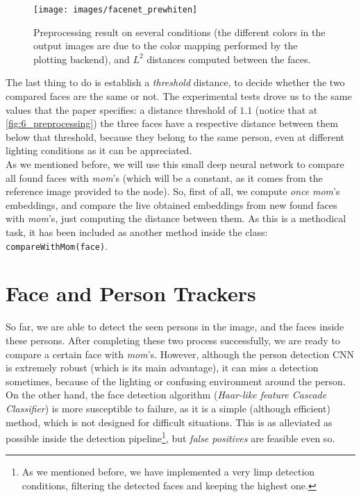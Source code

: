  \begin{figure}[h]
 	\centering
 	\texttt{[image: images/facenet\_prewhiten]}
 	\caption{Preprocessing result on several conditions (the different colors in the output images are due to the color mapping performed by the plotting backend), and $L^2$ distances computed between the faces.}
 	\label{fig:6_preprocessing}
 \end{figure}
 
 The last thing to do is establish a \emph{threshold} distance, to decide whether the two compared faces are the same or not. The experimental tests drove us to the same values that the paper \cite{facenet} specifies: a distance threshold of $1.1$ (notice that at \autoref{fig:6_preprocessing}) the three faces have a respective distance between them below that threshold, because they belong to the same person, even at different lighting conditions as it can be appreciated.\\
 
 As we mentioned before, we will use this small deep neural network to compare all found faces with \emph{mom}'s (which will be a constant, as it comes from the reference image provided to the node). So, first of all, we compute \emph{once} \emph{mom}'s embeddings, and compare the live obtained embeddings from new found faces with \emph{mom}'s, just computing the distance between them. As this is a methodical task, it has been included as another method inside the class: \texttt{compareWithMom(face)}.
 
\section{Face and Person Trackers}
	So far, we are able to detect the seen persons in the image, and the faces inside these persons. After completing these two process successfully, we are ready to compare a certain face with \emph{mom}'s. However, although the person detection CNN is extremely robust (which is its main advantage), it can miss a detection sometimes, because of the lighting or confusing environment around the person. On the other hand, the face detection algorithm (\emph{Haar-like feature Cascade Classifier}) is more susceptible to failure, as it is a simple (although efficient) method, which is not designed for difficult situations. This is as alleviated as possible inside the detection pipeline\footnote{As we mentioned before, we have implemented a very limp detection conditions, filtering the detected faces and keeping the highest one.}, but \emph{false positives} are feasible even so.\\
	
